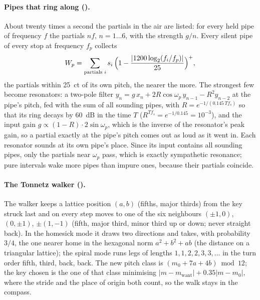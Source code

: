\paragraph{Pipes that ring along ().} About twenty times a second the partials in the air are
listed: for every held pipe of frequency $f$ the partials $nf$, $n = 1\dots6$, with the strength $g/n$. Every silent pipe
of every stop at frequency $f_p$ collects
\begin{equation}
  W_p = \sum_{\text{partials } i} s_i\,\Bigl(1 - \frac{|1200\log_2(f_i/f_p)|}{25}\Bigr)^+ ,
\end{equation}
the partials within \SI{25}{ct} of its own pitch, the nearer the more. The strongest few become resonators: a two-pole
filter $y_n = g\,x_n + 2R\cos\omega_p\,y_{n-1} - R^2y_{n-2}$ at the pipe's pitch, fed with the sum of all sounding pipes,
with $R = e^{-1/(0.145\,T f_s)}$ so that its ring decays by \SI{60}{dB} in the time $T$ ($R^{Tf_s} = e^{-1/0.145} = 10^{-3}$),
and the input gain $g \propto (1-R)\cdot2\sin\omega_p$, which is the inverse of the resonator's peak gain, so a partial
exactly at the pipe's pitch comes out as loud as it went in. Each resonator sounds at its own pipe's place. Since its
input contains all sounding pipes, only the partials near $\omega_p$ pass, which is exactly sympathetic resonance; pure
intervals wake more pipes than impure ones, because their partials coincide.

\paragraph{The Tonnetz walker ().} The walker keeps a lattice position $(a,b)$ (fifths, major thirds) from the
key struck last and on every step moves to one of the six neighbours $(\pm1,0)$, $(0,\pm1)$, $\pm(1,-1)$ (fifth, major
third, minor third up or down; never straight back). In the homesick mode it draws two directions and takes, with
probability $3/4$, the one nearer home in the hexagonal norm $a^2 + b^2 + ab$ (the distance on a triangular lattice); the
spiral mode runs legs of lengths $1,1,2,2,3,3,\dots$ in the turn order fifth, third, back, back. The new pitch class is
$(m_0 + 7a + 4b)\bmod 12$; the key chosen is the one of that class minimising $|m - m_\mathrm{want}| + 0.35|m - m_0|$,
where the stride and the place of origin both count, so the walk stays in the compass.

